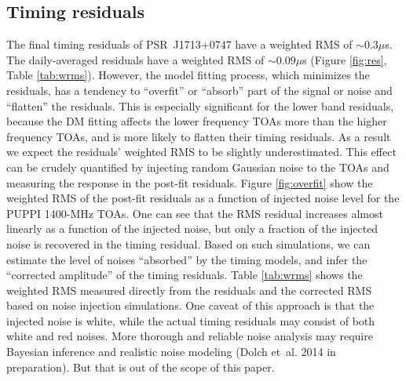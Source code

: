 \subsection{Timing residuals}
\label{sec:res}

The final timing residuals of PSR~J1713+0747 have a weighted RMS of
$\sim 0.3\mu$s. The daily-averaged residuals have a weighted RMS of $\sim
0.09\mu$s (Figure \ref{fig:res}, Table \ref{tab:wrms}).
However, the model fitting process, which minimizes the residuals, has a
tendency to ``overfit'' or ``absorb'' part of the signal or noise and
``flatten'' the residuals.
This is especially significant for the lower band residuals, because
the DM fitting affects the lower frequency TOAs more than the
higher frequency TOAs, and is more likely to flatten their timing residuals. 
As a result we expect the residuals' weighted RMS to be slightly
underestimated. This effect can be crudely quantified
by injecting random Gaussian noise to the TOAs and
measuring the response in the post-fit residuals. Figure \ref{fig:overfit} show
the weighted RMS of the post-fit residuals as a function of injected
noise level for the PUPPI 1400-MHz TOAs. 
One can see that the RMS residual increases almost linearly as a function of the
injected noise, but only a fraction of the injected noise is recovered in the timing 
residual. Based on such simulations, we
can estimate the level of noises ``absorbed'' by the timing models, and infer 
the ``corrected amplitude'' of the timing residuals. 
Table \ref{tab:wrms} shows the weighted RMS measured directly from the residuals 
and the corrected RMS based on noise injection simulations. One caveat 
of this approach is that the injected noise is white, while the actual timing
residuals may consist of both white and red noises. More thorough and
reliable noise analysis may require Bayesian inference and realistic
noise modeling (Dolch et~al. 2014 in preparation). But that is out of the scope of this paper.

